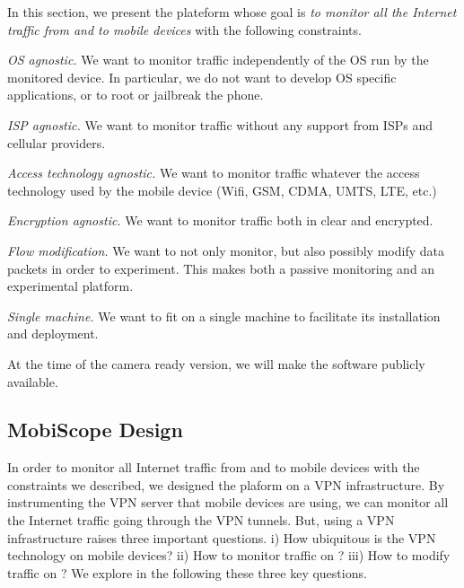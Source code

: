 In this section, we present the \platname{} plateform whose goal is
\emph{to monitor all the Internet traffic from and to mobile devices}
with the following constraints.
\begin{packedenumerate}
\item \emph{OS agnostic.} We want to monitor traffic independently of
  the OS run by the monitored device. In particular, we do not want to
  develop OS specific applications, or to root or jailbreak the phone.
\item \emph{ISP agnostic.} We want to monitor traffic without any
  support from ISPs and cellular providers.
\item \emph{Access technology agnostic.} We want to monitor traffic
  whatever the access technology used by the mobile device (Wifi, GSM,
  CDMA, UMTS, LTE, etc.)
\item \emph{Encryption agnostic.} We want to monitor traffic both in
  clear and encrypted.
\item \emph{Flow modification.} We want to not only monitor, but
  also possibly modify data packets in order to experiment. This makes
  \platname{} both a passive monitoring and an experimental
  platform. 
\item \emph{Single machine.} We want \platname{} to fit on a
  single machine to facilitate its installation and deployment. 
 \end{packedenumerate}    

At the time of the camera ready version, we will make the \platname{}
software publicly available. 


\subsection{MobiScope Design}



In order to monitor all Internet traffic from and to mobile devices
with the constraints we described, we designed the \platname{} plaform
on a VPN infrastructure. By instrumenting the VPN server that
mobile devices are using, we can monitor all the Internet traffic going
through the VPN tunnels. But, using a VPN infrastructure raises three
important questions. i) How ubiquitous is the VPN technology on mobile
devices?  ii) How to monitor traffic on \platname{}? iii) How to
modify traffic on \platname? We explore in the following these three key questions.

